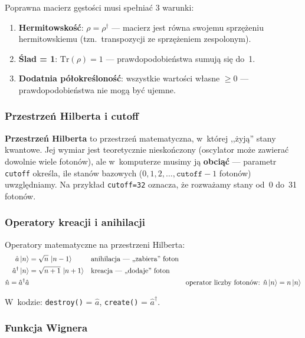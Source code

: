 \documentclass[12pt,a4paper]{article}
\begin{document}
\begin{infobox}
Poprawna macierz gęstości musi spełniać 3 warunki:
\begin{enumerate}
    \item \textbf{Hermitowskość}: $\rho = \rho^\dagger$ --- macierz jest równa swojemu sprzężeniu hermitowskiemu (tzn.\ transpozycji ze sprzężeniem zespolonym).
    \item \textbf{Ślad = 1}: $\mathrm{Tr}(\rho) = 1$ --- prawdopodobieństwa sumują się do~1.
    \item \textbf{Dodatnia półokreśloność}: wszystkie wartości własne $\geq 0$ --- prawdopodobieństwa nie mogą być ujemne.
\end{enumerate}
\end{infobox}

\subsubsection{Przestrzeń Hilberta i cutoff}

\textbf{Przestrzeń Hilberta} to przestrzeń matematyczna, w~której ,,żyją'' stany kwantowe. Jej wymiar jest teoretycznie nieskończony (oscylator może zawierać dowolnie wiele fotonów), ale w~komputerze musimy ją \textbf{obciąć} --- parametr \texttt{cutoff} określa, ile stanów bazowych ($0, 1, 2, \ldots, \texttt{cutoff}-1$ fotonów) uwzględniamy. Na przykład \texttt{cutoff=32} oznacza, że rozważamy stany od~0 do~31 fotonów.

\subsubsection{Operatory kreacji i anihilacji}

Operatory matematyczne na przestrzeni Hilberta:
\begin{align}
    \hat{a}\ket{n} &= \sqrt{n}\,\ket{n-1} && \text{anihilacja --- ,,zabiera'' foton} \\
    \hat{a}^\dagger\ket{n} &= \sqrt{n+1}\,\ket{n+1} && \text{kreacja --- ,,dodaje'' foton} \\
    \hat{n} = \hat{a}^\dagger\hat{a} && && \text{operator liczby fotonów: } \hat{n}\ket{n} = n\ket{n}
\end{align}

\noindent W~kodzie: \texttt{destroy()} = $\hat{a}$, \texttt{create()} = $\hat{a}^\dagger$.

\subsubsection{Funkcja Wignera}
\end{document}
